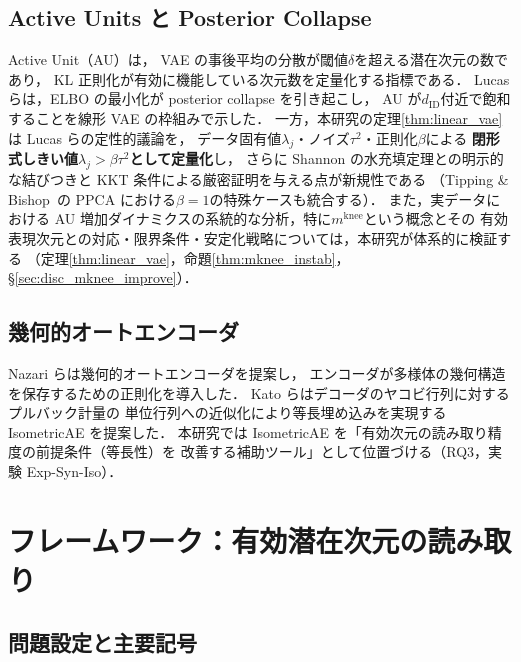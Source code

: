 \documentclass[11pt,a4paper]{jsarticle}
\newcommand{\mknee}{m^{\mathrm{knee}}}
\begin{document}
\subsection{Active Units と Posterior Collapse}\label{sec:related_au}

Active Unit（AU）\cite{lucas2019elbo,higgins2017betavae}は，
VAE の事後平均の分散が閾値$\delta$を超える潜在次元の数であり，
KL 正則化が有効に機能している次元数を定量化する指標である．
Lucas ら\cite{lucas2019elbo}は，ELBO の最小化が posterior collapse を引き起こし，
AU が$d_{\mathrm{ID}}$付近で飽和することを線形 VAE の枠組みで示した．
一方，本研究の定理\ref{thm:linear_vae}は Lucas らの定性的議論を，
データ固有値$\lambda_j$・ノイズ$\tau^2$・正則化$\beta$による
\textbf{閉形式しきい値$\lambda_j > \beta\tau^2$として定量化}し，
さらに Shannon の水充填定理との明示的な結びつきと KKT 条件による厳密証明を与える点が新規性である
（Tipping \& Bishop~\cite{tippingbishop1999ppca}の PPCA における$\beta=1$の特殊ケースも統合する）．
また，実データにおける AU 増加ダイナミクスの系統的な分析，特に$\mknee$という概念とその
有効表現次元との対応・限界条件・安定化戦略については，本研究が体系的に検証する
（定理\ref{thm:linear_vae}，命題\ref{thm:mknee_instab}，§\ref{sec:disc_mknee_improve}）．

\subsection{幾何的オートエンコーダ}\label{sec:related_geo}

Nazari ら\cite{nazari2023geometric}は幾何的オートエンコーダを提案し，
エンコーダが多様体の幾何構造を保存するための正則化を導入した．
Kato ら\cite{kato2020rdae}はデコーダのヤコビ行列に対するプルバック計量の
単位行列への近似化により等長埋め込みを実現する IsometricAE を提案した．
本研究では IsometricAE を「有効次元の読み取り精度の前提条件（等長性）を
改善する補助ツール」として位置づける（RQ3，実験 Exp-Syn-Iso）．

\section{フレームワーク：有効潜在次元の読み取り}\label{sec:framework}

\subsection{問題設定と主要記号}\label{sec:framework_setup}
\end{document}
